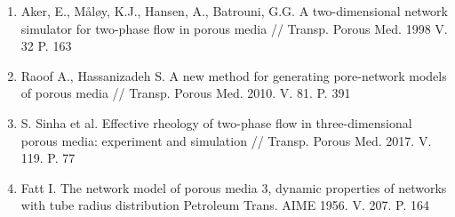 \begin{enumerate}
	\item Aker, E., Måløy, K.J., Hansen, A., Batrouni, G.G. A two-dimensional network simulator for two-phase flow in porous media // Transp. Porous Med. 1998 V. 32 P. 163 
	\item Raoof A., Hassanizadeh S. A new method for generating pore-network models of porous media // Transp. Porous Med. 2010. V. 81. P. 391
	\item S. Sinha et al. Effective rheology of two-phase flow in three-dimensional porous media: experiment and simulation // Transp. Porous Med. 2017. V. 119. P. 77
	\item Fatt I. The network model of porous media 3, dynamic properties of networks with tube radius distribution Petroleum Trans. AIME 1956. V. 207. P. 164
\end{enumerate}
